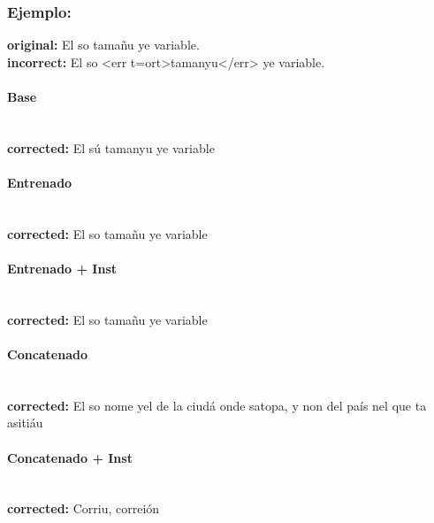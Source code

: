 \subsubsection{Ejemplo:}
\textbf{original:} El so tamañu ye variable.\\
\textbf{incorrect:} El so {\textless}err t=ort{\textgreater}tamanyu{\textless}/err{\textgreater} ye variable.\\

\paragraph{Base}~\\
\textbf{corrected:} El sú tamanyu ye variable\\

\paragraph{Entrenado}~\\
\textbf{corrected:} El so tamañu ye variable\\

\paragraph{Entrenado + Inst}~\\
\textbf{corrected:} El so tamañu ye variable\\

\paragraph{Concatenado}~\\
\textbf{corrected:} El so nome ye\textquotesingle{}l de la ciudá onde s\textquotesingle{}atopa, y non del país nel que ta asitiáu\\

\paragraph{Concatenado + Inst}~\\
\textbf{corrected:} Corriu, correión\\